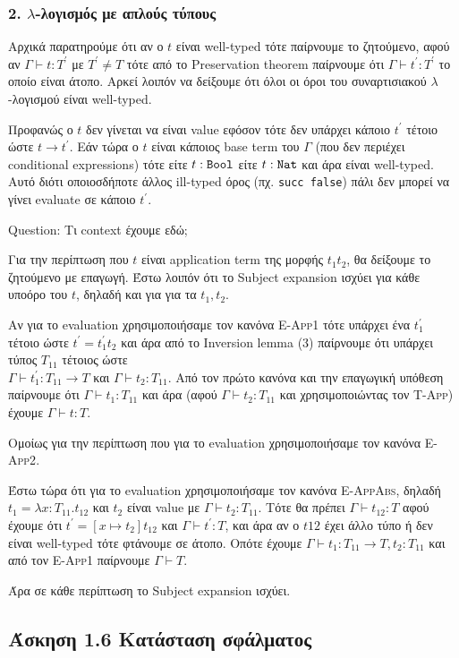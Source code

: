 \documentclass[a4paper,11pt]{article}
\newcommand\nred{\ensuremath{\longrightarrow}}
\begin{document}
\subsubsection*{2. $\lambda$-λογισμός με απλούς τύπους}
Αρχικά παρατηρούμε ότι αν ο $t$ είναι well-typed τότε παίρνουμε το ζητούμενο, αφού αν $\Gamma \vdash t:T^\prime$ με $T^\prime \neq T$ τότε από το Preservation theorem παίρνουμε ότι $\Gamma \vdash t^\prime:T^\prime$ το οποίο είναι άτοπο.
Αρκεί λοιπόν να δείξουμε ότι όλοι οι όροι του συναρτισιακού $\lambda$-λογισμού είναι well-typed.

Προφανώς ο $t$ δεν γίνεται να είναι value εφόσον τότε δεν υπάρχει κάποιο $t^\prime$ τέτοιο ώστε $t\nred t^\prime$.
Εάν τώρα ο $t$ είναι κάποιος base term του $\Gamma$ (που δεν περιέχει conditional expressions) τότε είτε $t:\verb|Bool|$ είτε $t:\verb|Nat|$ και άρα είναι well-typed.
Αυτό διότι οποιοσδήποτε άλλος ill-typed όρος (πχ. \verb|succ false|) πάλι δεν μπορεί να γίνει evaluate σε κάποιο $t^\prime$.

\vspace{5mm}

Question: Τι context έχουμε εδώ;

\vspace{5mm}

Για την περίπτωση που $t$ είναι application term της μορφής $t_1 t_2$, θα δείξουμε το ζητούμενο με επαγωγή. Έστω λοιπόν ότι το Subject expansion ισχύει για κάθε υποόρο του $t$, δηλαδή και για για τα $t_1,t_2$.

Αν για το evaluation χρησιμοποιήσαμε τον κανόνα \textsc{E-App1} τότε υπάρχει ένα $t_1^\prime$ τέτοιο ώστε $t^\prime=t_1^\prime t_2$ και άρα από το Inversion lemma (3) παίρνουμε ότι υπάρχει τύπος $T_{11}$ τέτοιος ώστε\\$\Gamma \vdash t_1^\prime:T_{11} \rightarrow T$ και $\Gamma \vdash t_2:T_{11}$.
Από τον πρώτο κανόνα και την επαγωγική υπόθεση παίρνουμε ότι $\Gamma \vdash t_1:T_{11}$ και άρα (αφού $\Gamma \vdash t_2:T_{11}$ και χρησιμοποιώντας τον \textsc{T-App}) έχουμε $\Gamma \vdash t:T$.

Ομοίως για την περίπτωση που για το evaluation χρησιμοποιήσαμε τον κανόνα \textsc{E-App2}.

Έστω τώρα ότι για το evaluation χρησιμοποιήσαμε τον κανόνα \textsc{E-AppAbs}, δηλαδή $t_1 = \lambda x:T_{11}.t_{12}$ και $t_2$ είναι value με $\Gamma \vdash t_2:T_{11}$.
Τότε θα πρέπει $\Gamma \vdash t_{12}:T$ αφού έχουμε ότι $t^\prime = [x \mapsto t_2]t_{12}$ και $\Gamma \vdash t^\prime:T$, και άρα αν ο $t{12}$ έχει άλλο τύπο ή δεν είναι well-typed τότε φτάνουμε σε άτοπο. Οπότε έχουμε $\Gamma \vdash t_1:T_{11} \rightarrow T, t_2:T_{11}$ και από τον \textsc{E-App1} παίρνουμε $\Gamma \vdash T$.

\vspace{5mm}

Άρα σε κάθε περίπτωση το Subject expansion ισχύει.

\subsection*{Άσκηση 1.6 Κατάσταση σφάλματος}
\end{document}
